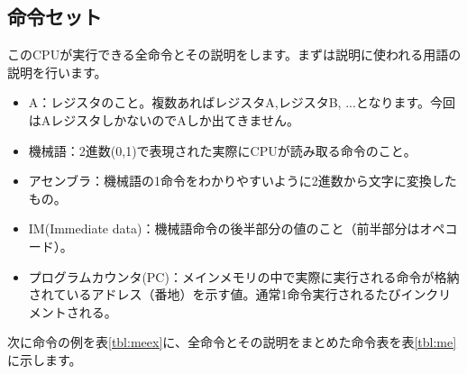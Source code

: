 \documentclass[11pt,b5paper,papersize,dvipdfmx]{jsbook}
\begin{document}
\subsection{命令セット}
このCPUが実行できる全命令とその説明をします。まずは説明に使われる用語の説明を行います。
\begin{itemize}
    \item A：レジスタのこと。複数あればレジスタA,レジスタB, ...となります。今回はAレジスタしかないのでAしか出てきません。
    \item 機械語：2進数(0,1)で表現された実際にCPUが読み取る命令のこと。
    \item アセンブラ：機械語の1命令をわかりやすいように2進数から文字に変換したもの。
    \item IM(Immediate data)：機械語命令の後半部分の値のこと（前半部分はオペコード）。
    \item プログラムカウンタ(PC)：メインメモリの中で実際に実行される命令が格納されているアドレス（番地）を示す値。通常1命令実行されるたびインクリメントされる。
\end{itemize}
次に命令の例を表\ref{tbl:meex}に、全命令とその説明をまとめた命令表を表\ref{tbl:me}に示します。
\end{document}
